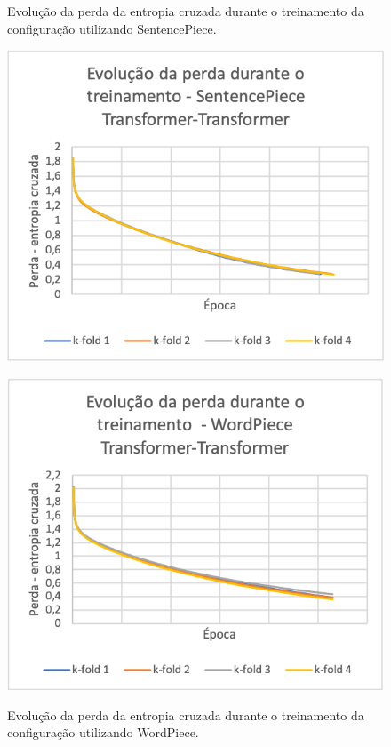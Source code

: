 \begin{figure}[htbp]
    \centering
    \begin{minipage}{0.49\textwidth}
        \centering
            \caption{Evolução da perda da entropia cruzada durante o treinamento da configuração \xfmrxfmr{} utilizando SentencePiece.}
            \includegraphics[width=\textwidth]{resources/images/results/result_train_loss_sentencepiece_xfmr_ptbr.png}
            \label{fig:result_train_loss_xfmr_sentencepiece}
    \end{minipage} \hfill
    \begin{minipage}{0.49\textwidth}
        \centering
            \caption{Evolução da perda da entropia cruzada durante o treinamento da configuração \xfmrxfmr{} utilizando WordPiece.}
            \includegraphics[width=\textwidth]{resources/images/results/result_train_loss_wordpiece_xfmr_ptbr.png}
            \label{fig:result_train_loss_xfmr_wordpiece}
    \end{minipage}
\end{figure}

